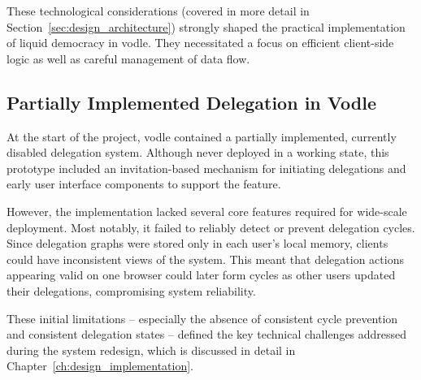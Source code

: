 These technological considerations (covered in more detail in Section~\ref{sec:design_architecture}) strongly shaped the practical implementation of liquid democracy in vodle. They necessitated a focus on efficient client-side logic as well as careful management of data flow.

\subsection{Partially Implemented Delegation in Vodle}\label{subsec:background_existing_delegation}
At the start of the project, vodle contained a partially implemented, currently disabled delegation system.  
Although never deployed in a working state, this prototype included an invitation-based mechanism for initiating delegations and early user interface components to support the feature.

However, the implementation lacked several core features required for wide-scale deployment. Most notably, it failed to reliably detect or prevent delegation cycles. Since delegation graphs were stored only in each user's local memory, clients could have inconsistent views of the system. This meant that delegation actions appearing valid on one browser could later form cycles as other users updated their delegations, compromising system reliability.

These initial limitations -- especially the absence of consistent cycle prevention and consistent delegation states -- defined the key technical challenges addressed during the system redesign, which is discussed in detail in Chapter~\ref{ch:design_implementation}.



